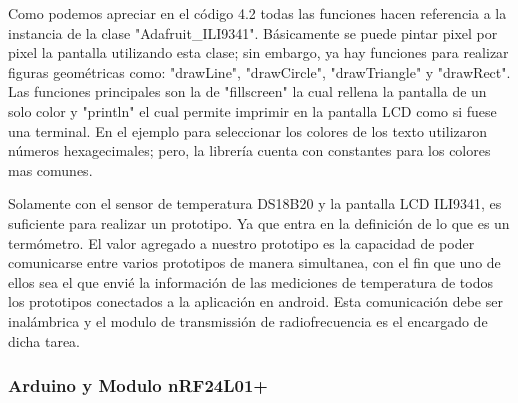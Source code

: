 \par \noindent
Como podemos apreciar en el código 4.2 todas las funciones hacen referencia a la instancia de la clase "Adafruit\_ILI9341". Básicamente se puede pintar pixel por pixel la pantalla utilizando esta clase; sin embargo, ya hay funciones para realizar figuras geométricas como: "drawLine", "drawCircle", "drawTriangle" y "drawRect". Las funciones principales  son la de "fillscreen" la cual rellena la pantalla de un solo color y "println" el cual permite imprimir en la pantalla LCD como si fuese una terminal. En el ejemplo para seleccionar los colores de los texto utilizaron números hexagecimales; pero, la librería cuenta con constantes para los colores mas comunes.

\par \noindent
Solamente con el sensor de temperatura DS18B20 y la pantalla LCD ILI9341, es suficiente para realizar un prototipo. Ya que entra en la definición de lo que es un termómetro. El valor agregado a nuestro prototipo es la capacidad de poder comunicarse entre varios prototipos de manera simultanea, con el fin que uno de ellos sea el que envié la información de las mediciones de temperatura de todos los prototipos conectados a la aplicación en android. Esta comunicación debe ser inalámbrica y el modulo de transmissión de radiofrecuencia es el encargado de dicha tarea.

\subsubsection{Arduino y Modulo nRF24L01+}
